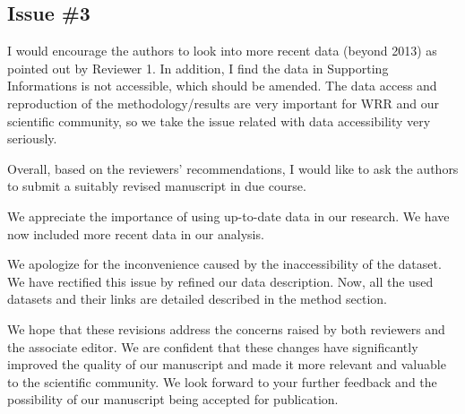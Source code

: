 \subsection{Issue \#3}
\RC{} I would encourage the authors to look into more recent data (beyond 2013) as pointed out by Reviewer 1. In addition, I find the data in Supporting Informations is not accessible, which should be amended. The data access and reproduction of the methodology/results are very important for WRR and our scientific community, so we take the issue related with data accessibility very seriously.

\RC*{} Overall, based on the reviewers' recommendations, I would like to ask the authors to submit a suitably revised manuscript in due course.

\AR{} We appreciate the importance of using up-to-date data in our research. We have now included more recent data in our analysis.

\AR*{} We apologize for the inconvenience caused by the inaccessibility of the dataset. We have rectified this issue by refined our data description. Now, all the used datasets and their links are detailed described in the method section.

\AR*{} We hope that these revisions address the concerns raised by both reviewers and the associate editor. We are confident that these changes have significantly improved the quality of our manuscript and made it more relevant and valuable to the scientific community. We look forward to your further feedback and the possibility of our manuscript being accepted for publication.
